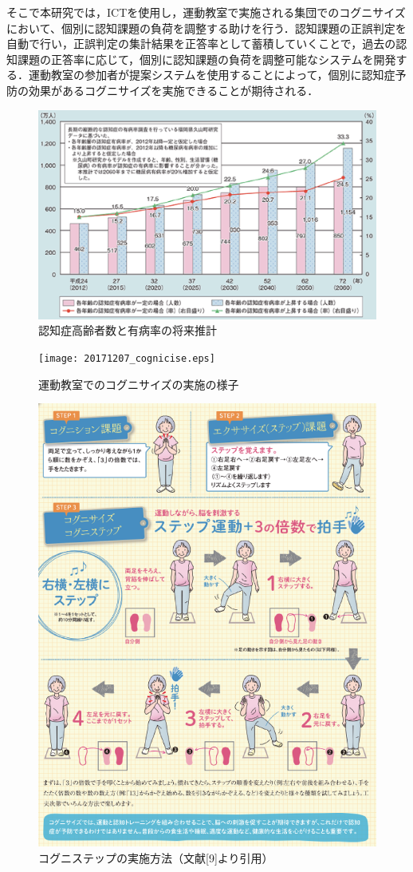 \documentclass{jarticle}
\begin{document}
そこで本研究では，ICTを使用し，運動教室で実施される集団でのコグニサイズにおいて、個別に認知課題の負荷を調整する助けを行う．認知課題の正誤判定を自動で行い，正誤判定の集計結果を正答率として蓄積していくことで，過去の認知課題の正答率に応じて，個別に認知課題の負荷を調整可能なシステムを開発する．運動教室の参加者が提案システムを使用することによって，個別に認知症予防の効果があるコグニサイズを実施できることが期待される．

\begin{figure}[b]
\begin{center}
\includegraphics[width=.47\textwidth]{ninchishoukoureishasu.eps}
\caption{認知症高齢者数と有病率の将来推計}
\label{fig:tadou}
\end{center}
\end{figure}

\begin{figure}[tb]
\begin{center}
\texttt{[image: 20171207\_cognicise.eps]}
\caption{運動教室でのコグニサイズの実施の様子}
\label{fig:HMD}
\end{center}
\end{figure}

\begin{figure}[tb]
\begin{center}
\includegraphics[width=.47\textwidth]{cognistep.eps}
\caption{コグニステップの実施方法（文献[9]より引用）}
\label{fig:HMD}
\end{center}
\end{figure}
\end{document}
